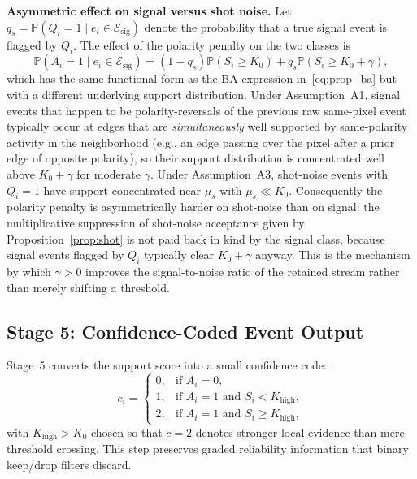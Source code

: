\documentclass[a4paper,fleqn]{cas-dc}
\newcommand{\Prob}{\mathbb{P}}
\begin{document}
\textbf{Asymmetric effect on signal versus shot noise.}
Let $q_s = \Prob(Q_i=1\mid e_i\in\mathcal{E}_{\text{sig}})$ denote the probability that a true signal event is flagged by $Q_i$. The effect of the polarity penalty on the two classes is
\begin{equation}
\Prob(A_i=1\mid e_i\in\mathcal{E}_{\text{sig}}) = (1-q_s)\Prob(S_i\geq K_0) + q_s\Prob(S_i\geq K_0+\gamma),
\label{eq:sig_accept}
\end{equation}
which has the same functional form as the BA expression in~\eqref{eq:prop_ba} but with a different underlying support distribution. Under Assumption~A1, signal events that happen to be polarity-reversals of the previous raw same-pixel event typically occur at edges that are \emph{simultaneously} well supported by same-polarity activity in the neighborhood (e.g., an edge passing over the pixel after a prior edge of opposite polarity), so their support distribution is concentrated well above $K_0+\gamma$ for moderate $\gamma$. Under Assumption~A3, shot-noise events with $Q_i{=}1$ have support concentrated near $\mu_s$ with $\mu_s\ll K_0$. Consequently the polarity penalty is asymmetrically harder on shot-noise than on signal: the multiplicative suppression of shot-noise acceptance given by Proposition~\ref{prop:shot} is not paid back in kind by the signal class, because signal events flagged by $Q_i$ typically clear $K_0+\gamma$ anyway. This is the mechanism by which $\gamma>0$ improves the signal-to-noise ratio of the retained stream rather than merely shifting a threshold.

\subsection{Stage 5: Confidence-Coded Event Output}
\label{sec:confidence}

Stage~5 converts the support score into a small confidence code:
\begin{equation}
c_i =
\begin{cases}
0, & \text{if } A_i = 0,\\
1, & \text{if } A_i = 1 \text{ and } S_i < K_{\text{high}},\\
2, & \text{if } A_i = 1 \text{ and } S_i \geq K_{\text{high}},
\end{cases}
\label{eq:confidence}
\end{equation}
with $K_{\text{high}} > K_0$ chosen so that $c=2$ denotes stronger local evidence than mere threshold crossing. This step preserves graded reliability information that binary keep/drop filters discard.
\end{document}
